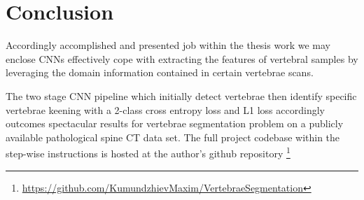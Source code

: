 \chapter{Conclusion}
\label{ch:conclusion}
Accordingly  accomplished and presented job within the thesis work we may enclose CNNs effectively cope with extracting the features of vertebral samples by leveraging the domain information contained in certain vertebrae scans.

The two stage CNN pipeline which initially detect vertebrae then identify specific vertebrae keening with a 2-class cross entropy loss  and L1 loss accordingly outcomes spectacular results for vertebrae segmentation problem on a publicly available pathological spine CT data set. The full project codebase within the step-wise instructions is hosted at the author's github repository \footnote{ \url{https://github.com/KumundzhievMaxim/VertebraeSegmentation}}